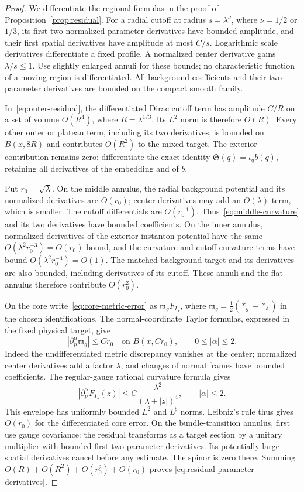 \documentclass[11pt]{amsart}
\theoremstyle{definition}
\theoremstyle{remark}
\theoremstyle{plain}
\begin{document}
\begin{proof}
We differentiate the regional formulas in the proof of
Proposition~\ref{prop:residual}.  For a radial cutoff at radius
$s=\lambda^\nu$, where $\nu=1/2$ or $1/3$, its first two normalized
parameter derivatives have bounded amplitude, and their first spatial
derivatives have amplitude at most $C/s$.  Logarithmic scale derivatives
differentiate a fixed profile.  A normalized center derivative gains
$\lambda/s\leq1$.  Use slightly enlarged annuli for these bounds;
no characteristic function of a moving region is differentiated.
All background coefficients and their two parameter derivatives are
bounded on the compact smooth family.

In~\eqref{eq:outer-residual}, the differentiated Dirac cutoff term has
amplitude $C/R$ on a set of volume $O(R^4)$, where $R=\lambda^{1/3}$.
Its $L^2$ norm is therefore $O(R)$.  Every other outer or plateau term,
including its two derivatives, is bounded on $B(x,8R)$ and contributes
$O(R^2)$ to the mixed target.  The exterior contribution remains zero:
differentiate the exact identity $\mathfrak S(q)=\iota_qb(q)$, retaining
all derivatives of the embedding and of $b$.

Put $r_0=\sqrt\lambda$.  On the middle annulus, the radial background
potential and its normalized derivatives are $O(r_0)$; center
derivatives may add an $O(\lambda)$ term, which is smaller.
The cutoff differentials are $O(r_0^{-1})$.
Thus~\eqref{eq:middle-curvature} and its two derivatives have bounded
coefficients.  On the inner annulus, normalized derivatives of the
exterior instanton potential have the same
$O(\lambda^2r_0^{-3})=O(r_0)$ bound, and the curvature and cutoff
curvature terms have bound $O(\lambda^2r_0^{-4})=O(1)$.
The matched background target and its derivatives are also bounded,
including derivatives of its cutoff.  These annuli and the flat annulus
therefore contribute $O(r_0^2)$.

On the core write~\eqref{eq:core-metric-error} as
$\mathfrak m_gF_{I_\lambda}$, where
$\mathfrak m_g=\tfrac12(*_g-*_\delta)$ in the chosen identifications.
The normal-coordinate Taylor formulas, expressed in the fixed physical
target, give
\[
 |\partial_p^\alpha\mathfrak m_g|\leq Cr_0
 \quad\text{on }B(x,Cr_0),\qquad 0\leq|\alpha|\leq2.
\]
Indeed the undifferentiated metric discrepancy vanishes at the center;
normalized center derivatives add a factor $\lambda$, and changes of
normal frames have bounded coefficients.  The regular-gauge rational
curvature formula gives
\[
 |\partial_p^\alpha F_{I_\lambda}(z)|
 \leq C\frac{\lambda^2}{(\lambda+|z|)^4},\qquad |\alpha|\leq2.
\]
This envelope has uniformly bounded $L^2$ and $L^\sharp$ norms.
Leibniz's rule thus gives $O(r_0)$ for the differentiated core error.
On the bundle-transition annulus, first use gauge covariance: the
residual transforms as a target section by a unitary multiplier with
bounded first two parameter derivatives.  Its potentially large spatial
derivatives cancel before any estimate.  The spinor is zero there.
Summing $O(R)+O(R^2)+O(r_0^2)+O(r_0)$ proves
\eqref{eq:residual-parameter-derivatives}.


\end{proof}
\end{document}
